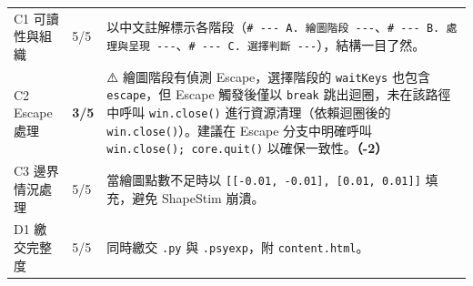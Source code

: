 \documentclass[14pt,]{extarticle}
\begin{document}
\begin{longtable}[]{@{}lll@{}}
\begin{minipage}[t]{0.07\columnwidth}\raggedright
C1 可讀性與組織\strut
\end{minipage} & \begin{minipage}[t]{0.03\columnwidth}\raggedright
5/5\strut
\end{minipage} & \begin{minipage}[t]{0.82\columnwidth}\raggedright
以中文註解標示各階段（\texttt{\#\ -\/-\/-\ A.\ 繪圖階段\ -\/-\/-}、\texttt{\#\ -\/-\/-\ B.\ 處理與呈現\ -\/-\/-}、\texttt{\#\ -\/-\/-\ C.\ 選擇判斷\ -\/-\/-}），結構一目了然。\strut
\end{minipage}\tabularnewline
\begin{minipage}[t]{0.07\columnwidth}\raggedright
C2 Escape 處理\strut
\end{minipage} & \begin{minipage}[t]{0.03\columnwidth}\raggedright
\textbf{3/5}\strut
\end{minipage} & \begin{minipage}[t]{0.82\columnwidth}\raggedright
⚠️ 繪圖階段有偵測 Escape，選擇階段的 \texttt{waitKeys} 也包含
\texttt{\textquotesingle{}escape\textquotesingle{}}，但 Escape
觸發後僅以 \texttt{break} 跳出迴圈，未在該路徑中呼叫
\texttt{win.close()} 進行資源清理（依賴迴圈後的
\texttt{win.close()}）。建議在 Escape 分支中明確呼叫
\texttt{win.close();\ core.quit()} 以確保一致性。\textbf{（-2）}\strut
\end{minipage}\tabularnewline
\begin{minipage}[t]{0.07\columnwidth}\raggedright
C3 邊界情況處理\strut
\end{minipage} & \begin{minipage}[t]{0.03\columnwidth}\raggedright
5/5\strut
\end{minipage} & \begin{minipage}[t]{0.82\columnwidth}\raggedright
當繪圖點數不足時以
\texttt{{[}{[}-0.01,\ -0.01{]},\ {[}0.01,\ 0.01{]}{]}} 填充，避免
ShapeStim 崩潰。\strut
\end{minipage}\tabularnewline
\begin{minipage}[t]{0.07\columnwidth}\raggedright
D1 繳交完整度\strut
\end{minipage} & \begin{minipage}[t]{0.03\columnwidth}\raggedright
5/5\strut
\end{minipage} & \begin{minipage}[t]{0.82\columnwidth}\raggedright
同時繳交 \texttt{.py} 與 \texttt{.psyexp}，附
\texttt{content.html}。\strut
\end{minipage}\tabularnewline

\end{longtable}
\end{document}
